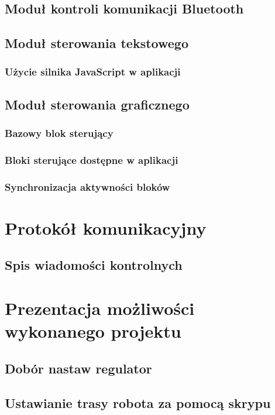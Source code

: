 \documentclass[eng,printmode]{mgr}
\begin{document}
 \section{Moduł kontroli komunikacji Bluetooth}
 \section{Moduł sterowania tekstowego}
   \subsection{Użycie silnika JavaScript w aplikacji}
 \section{Moduł sterowania graficznego}
   \subsection{Bazowy blok sterujący}
   \subsection{Bloki sterujące dostępne w aplikacji}
   \subsection{Synchronizacja aktywności bloków}

\chapter{Protokół komunikacyjny}  

 \section{Spis wiadomości kontrolnych}   

  
  \chapter{Prezentacja możliwości wykonanego projektu}

 \section{Dobór nastaw regulator}
 \section{Ustawianie trasy robota za pomocą skrypu}
\end{document}
